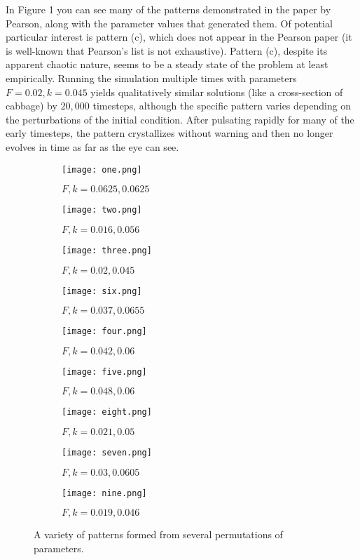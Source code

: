 \documentclass[12pt]{article}
\begin{document}
In Figure 1 you can see many of the patterns demonstrated in the paper by Pearson, along with the parameter values that generated them. Of potential particular interest is pattern (c), which does not appear in the Pearson paper (it is well-known that Pearson's list is not exhaustive). Pattern (c), despite its apparent chaotic nature, seems to be a steady state of the problem at least empirically. Running the simulation multiple times with parameters $F = 0.02, k = 0.045$ yields qualitatively similar solutions (like a cross-section of cabbage) by $20,000$ timesteps, although the specific pattern varies depending on the perturbations of the initial condition. After pulsating rapidly for many of the early timesteps, the pattern crystallizes without warning and then no longer evolves in time as far as the eye can see.

\begin{figure}
\centering
\begin{subfigure}{.3\linewidth}
	\centering
	\texttt{[image: one.png]}
	\caption{$F,k = 0.0625, 0.0625$}
\end{subfigure}
\begin{subfigure}{.3\linewidth}
	\centering
	\texttt{[image: two.png]}
	\caption{$F,k = 0.016, 0.056$}
\end{subfigure}
\begin{subfigure}{.3\linewidth}
	\centering
	\texttt{[image: three.png]}
	\caption{$F,k = 0.02, 0.045$}
\end{subfigure}
\begin{subfigure}{.3\linewidth}
	\centering
	\texttt{[image: six.png]}
	\caption{$F,k = 0.037, 0.0655$}
\end{subfigure}
\begin{subfigure}{.3\linewidth}
	\centering
	\texttt{[image: four.png]}
	\caption{$F,k = 0.042, 0.06$}
\end{subfigure}
\begin{subfigure}{.3\linewidth}
	\centering
	\texttt{[image: five.png]}
	\caption{$F,k = 0.048, 0.06$}
\end{subfigure}
\begin{subfigure}{.3\linewidth}
	\centering
	\texttt{[image: eight.png]}
	\caption{$F,k = 0.021, 0.05$}
\end{subfigure}
\begin{subfigure}{.3\linewidth}
	\centering
	\texttt{[image: seven.png]}
	\caption{$F,k = 0.03, 0.0605$}
\end{subfigure}
\begin{subfigure}{.3\linewidth}
	\centering
	\texttt{[image: nine.png]}
	\caption{$F,k = 0.019, 0.046$}
\end{subfigure}
\caption{A variety of patterns formed from several permutations of parameters.}
\end{figure}
\end{document}
